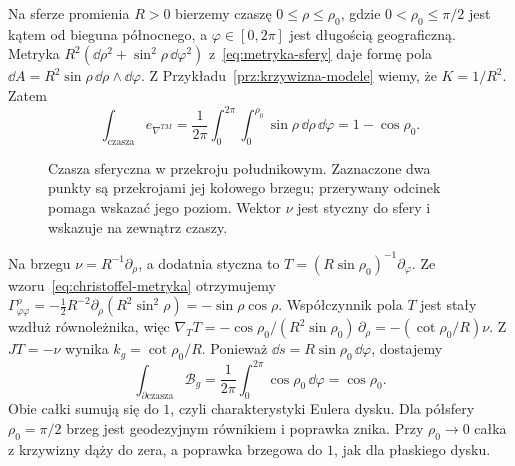 \begin{przyklad}
\label{prz:CGB-czasza-17}
Na sferze promienia $R>0$ bierzemy czaszę
$0\leq\rho\leq\rho_0$, gdzie $0<\rho_0\leq\pi/2$
jest kątem od bieguna północnego, a $\varphi\in[0,2\pi]$
jest długością geograficzną.
Metryka $R^2(\dd\rho^2+\sin^2\rho\,\dd\varphi^2)$
z~\eqref{eq:metryka-sfery} daje formę pola
$\dd A=R^2\sin\rho\,\dd\rho\wedge\dd\varphi$.
Z Przykładu~\ref{prz:krzywizna-modele} wiemy, że $K=1/R^2$.
Zatem
\[
 \int_{\text{czasza}}e_{\nabla^{TM}}
 =\frac1{2\pi}\int_0^{2\pi}\int_0^{\rho_0}
          \sin\rho\,\dd\rho\,\dd\varphi
 =1-\cos\rho_0.
\]

\begin{figure}[H]
\centering
{}
\caption{Czasza sferyczna w przekroju południkowym.
Zaznaczone dwa punkty są przekrojami jej kołowego brzegu;
przerywany odcinek pomaga wskazać jego poziom.
Wektor $\nu$ jest styczny do sfery i wskazuje na zewnątrz czaszy.}
\label{fig:CGB-czasza-dwa-skladniki}
\end{figure}

Na brzegu $\nu=R^{-1}\partial_\rho$,
a dodatnia styczna to $T=(R\sin\rho_0)^{-1}\partial_\varphi$.
Ze wzoru~\eqref{eq:christoffel-metryka} otrzymujemy
$\Gamma^\rho_{\varphi\varphi}
=-\frac12R^{-2}\partial_\rho(R^2\sin^2\rho)
=-\sin\rho\cos\rho$.
Współczynnik pola $T$ jest stały wzdłuż równoleżnika,
więc
$\nabla_TT=-\cos\rho_0/(R^2\sin\rho_0)\,\partial_\rho
=-(\cot\rho_0/R)\nu$.
Z $JT=-\nu$ wynika $k_g=\cot\rho_0/R$.
Ponieważ $\dd s=R\sin\rho_0\,\dd\varphi$, dostajemy
\[
 \int_{\partial\text{czasza}}\mathcal B_g
 =\frac1{2\pi}\int_0^{2\pi}\cos\rho_0\,\dd\varphi
 =\cos\rho_0.
\]
Obie całki sumują się do $1$, czyli charakterystyki
Eulera dysku. Dla półsfery $\rho_0=\pi/2$ brzeg jest
geodezyjnym równikiem i poprawka znika.
Przy $\rho_0\to0$ całka z krzywizny dąży do zera,
a poprawka brzegowa do $1$, jak dla płaskiego dysku.
\end{przyklad}



